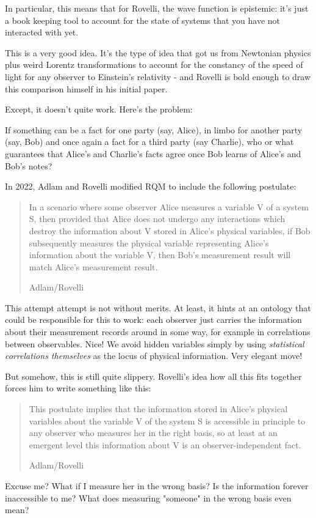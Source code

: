 \documentclass{article}
\begin{document}
In particular, this means that for Rovelli, the wave function is epistemic: it's just a book keeping tool to account for the state of systems that you have not interacted with yet.

This is a very good idea. It's the type of idea that got us from Newtonian physics plus weird Lorentz transformations to account for the constancy of the speed of light for any observer to Einstein's relativity - and Rovelli is bold enough to draw this comparison himself in his initial paper.

Except, it doesn't quite work. Here's the problem:

If something can be a fact for one party (say, Alice), in limbo for another party (say, Bob) and once again a fact for a third party (say Charlie), who or what guarantees that Alice's and Charlie's facts agree once Bob learns of Alice's and Bob's notes?

In 2022, Adlam and Rovelli \cite{pittphilsci20469} modified RQM to include the following postulate:

\blockquote[Adlam/Rovelli]{
In a scenario where some observer Alice measures a variable V of a system S, then provided that Alice does not undergo any interactions which destroy the information about V stored in Alice’s physical variables, if Bob subsequently measures the physical variable representing Alice’s information about the variable V, then Bob’s measurement result will match Alice’s measurement result.
}

This attempt attempt is not without merits. At least, it hints at an ontology that could be responsible for this to work: each observer just carries the information about their measurement records around in some way, for example in correlations between observables. Nice! We avoid hidden variables simply by using \textit{statistical correlations themselves} as the locus of physical information. Very elegant move!

But somehow, this is still quite slippery. Rovelli's idea how all this fits together forces him to write something like this:

\blockquote[Adlam/Rovelli]{
This postulate implies that the information stored in Alice’s physical variables about the variable V of the system S is accessible in principle to any observer who measures her in the right basis, so at least at an emergent level this information about V is an observer-independent fact.
}

Excuse me? What if I measure her in the wrong basis? Is the information forever inaccessible to me? What does measuring "someone" in the wrong basis even mean?
\end{document}
